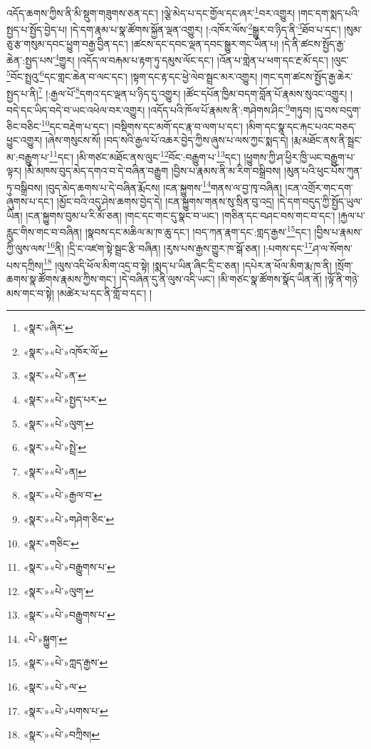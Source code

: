 འདོད་ཆགས་ཀྱིས་ནི་མི་སྡུག་གཟུགས་ཅན་དང་། །ལྕེ་མེད་པ་དང་གྱོལ་དང་ཞར་\footnote{«སྣར་»ཞིར་}བར་འགྱུར། །གང་དག་སྨད་པའི་སྤྱད་པ་སྤྱོད་བྱེད་པ། །དེ་དག་རྣམ་པ་སྣ་ཚོགས་སྐྱོན་ལྡན་འགྱུར། །:འཁོར་ལོས་\footnote{«སྣར་»«པེ་»འཁོར་ལོ་}སྒྱུར་བ་ཉིད་ནི་\footnote{«སྣར་»«པེ་»ན་}ཐོབ་པ་དང་། །སུམ་ཅུ་རྩ་གསུམ་དབང་ཕྱུག་བརྒྱ་བྱིན་དང་། །ཚངས་དང་དབང་ལྡན་དབང་སྒྱུར་གང་ཡིན་པ། །དེ་ནི་ཚངས་སྤྱོད་རྒྱ་ཆེན་:སྤྱད་པས་\footnote{«སྣར་»«པེ་»སྤྱད་པར་}གྱུར། །འདོད་ལ་བརྐམ་པ་རྟག་ཏུ་དམུས་ལོང་དང་། །འོན་པ་གླེན་པ་ཕག་དང་རྔ་མོ་དང་། །ལུང་\footnote{«སྣར་»«པེ་»ལུག་}བོང་སྤྲའུ་\footnote{«སྣར་»«པེ་»སྤྲེ་}དང་གླང་ཆེན་བ་ལང་དང་། །སྟག་དང་རྟ་དང་ཕྱེ་ལེབ་སྦྲང་མར་འགྱུར། །གང་དག་ཚངས་སྤྱོད་རྒྱ་ཆེར་སྤྱད་པ་ནི།\footnote{«སྣར་»«པེ་»ན།} །:རྒྱལ་པོ་\footnote{«སྣར་»«པེ་»རྒྱལ་བ་}དགའ་དང་ལྡན་པ་ཉིད་དུ་འགྱུར། །ཚོང་དཔོན་ཁྱིམ་བདག་བློན་པོ་རྣམས་སུའང་འགྱུར། །བདེ་དང་ཡིད་བདེ་བ་ཡང་འཕེལ་བར་འགྱུར། །འདོད་པའི་ཁོལ་པོ་རྣམས་ནི་:གཤེགས་ཤིང་\footnote{«སྣར་»«པེ་»གཤེག་ཅིང་}གཏུབ། །དུ་བས་བདུག་ཅིང་བཅིང་\footnote{«སྣར་»གཅིང་}དང་བརྡེག་པ་དང་། །བསྡིགས་དང་མགོ་དང་རྣ་བ་ལག་པ་དང་། །མིག་དང་སྣ་དང་རྐང་པའང་བཅད་ཕྱུང་འགྱུར། །ཞེས་གསུངས་སོ། །བད་སའི་རྒྱལ་པོ་འཆར་བྱེད་ཀྱིས་ཞུས་པ་ལས་ཀྱང་སྨད་དེ། །རྨ་མཐོང་ནས་ནི་སྦྲང་མ་:བརྒྱུག་པ་\footnote{«སྣར་»«པེ་»བརྒྱུགས་པ་}དང་། །མི་གཙང་མཐོང་ནས་ལུང་\footnote{«སྣར་»«པེ་»ལུག་}བོང་:བརྒྱུག་པ་\footnote{«སྣར་»«པེ་»བརྒྱུགས་པ་}དང་། །ཕྱུགས་ཀྱི་ཤ་ཕྱིར་ཁྱི་ཡང་བརྒྱུག་པ་ལྟར། །མི་མཁས་བུད་མེད་དགའ་བ་དེ་བཞིན་བརྒྱུག །བྱིས་པ་རྣམས་ནི་མ་རིག་བསྒྲིབས། །མུན་པའི་ཕུང་པོས་ཀུན་ཏུ་བསྒྲིབས། །བུད་མེད་ཆགས་པ་དེ་བཞིན་རྨོངས། །ངན་སྐྱུགས་\footnote{«པེ་»སྐྱུག་}གནས་ལ་བྱ་ཁྭ་བཞིན། །ངན་འགྲོར་གང་དག་ཞུགས་པ་དང་། །མྱོང་བའི་འདུ་ཤེས་ཆགས་བྱེད་དེ། །ངན་སྐྱུགས་གནས་སུ་སྲིན་བུ་འདྲ། །དེ་དག་བདུད་ཀྱི་སྤྱོད་ཡུལ་ཡིན། །ངན་སྐྱུགས་བུམ་པ་རི་མོ་ཅན། །གང་དང་གང་དུ་སྣང་བ་ཡང་། །གཅིན་དང་བཤང་བས་གང་བ་དང་། །རྐྱལ་པ་རླུང་གིས་གང་བ་བཞིན། །སྣབས་དང་མཆིལ་མ་ཁ་ཆུ་དང་། །བད་ཀན་རྣག་དང་:གླད་རྒྱས་\footnote{«སྣར་»«པེ་»ཀླད་རྒྱས་}དང་། །བྱིས་པ་རྣམས་ཀྱི་ལུས་ལས་\footnote{«སྣར་»«པེ་»ལ་}ནི། །དྲི་ང་འཛག་སྟེ་སྦྲང་རྩི་བཞིན། །རུས་པས་རྒྱས་གྱུར་ཁ་སྒོ་ཅན། །:པགས་དང་\footnote{«སྣར་»«པེ་»པགས་པ་}ཤ་ལ་སོགས་པས་དཀྲིས།\footnote{«སྣར་»«པེ་»བཀྲིས།} །ལུས་འདི་ཕོལ་མིག་འདྲ་བ་སྟེ། །སྨད་པ་ཡིན་ཞིང་དྲི་ང་ཅན། །དཔེར་ན་ཕོལ་མིག་རྨ་ཁ་ནི། །སྲོག་ཆགས་སྣ་ཚོགས་རྣམས་ཀྱིས་གང་། །དེ་བཞིན་དུ་ནི་ལུས་འདི་ཡང་། །མི་གཙང་སྣ་ཚོགས་སྣོད་ཡིན་ནོ། །ལྟོ་ནི་གཉེ་མས་གང་བ་སྟེ། །མཚེར་པ་དང་ནི་གློ་བ་དང་། །
